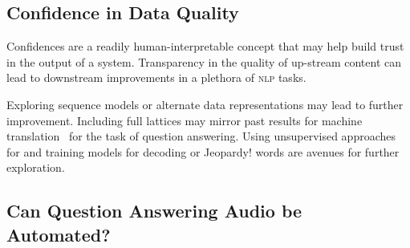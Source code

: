 \begin{comment}

By manually examining the predictions of the seq2seq model, we notice that the main source of errors is that the model tends to find a short path to completing the rewrites. That often results in \textit{under-specified questions} as in Example~1 in Table~\ref{tab:erranalysis}, \textit{question meaning change} as in Example~2 or \textit{meaningless questions} as in Example~3.

Another source of errors is having related entities mentioned in the context as 
Example~4 in Table~\ref{tab:erranalysis}, where the model confused ``Copa America''
with ``Argentina''. The model also struggles with listing multiple entities mentioned in different parts of the context. Example~5 in Table~\ref{tab:erranalysis}
show the output and the reference rewrites of the question \textit{``Did she have any more works than those 3?''}, where two of the three
	entities---``United States of Banana'', ``La Comedia'' and ``Asalto al tiempo''---are lost in the rewrite.  

\end{comment}


\subsection{Confidence in Data Quality}
\label{sec:discussion}


Confidences are a readily human-interpretable concept that may help build trust in the output of a system.
%
Transparency in the quality of up-stream content can lead to downstream improvements in a plethora of \textsc{nlp} tasks.

Exploring sequence models or alternate data representations may lead
to further improvement.  Including full lattices may mirror past results for machine
translation~\citep{sperber17emnlp} for the task of question answering.
Using unsupervised approaches for \asr{}
\citep{wessel2004unsupervised,lee2009unsupervised} and training \asr{}
models for decoding \qb{} or Jeopardy! words are avenues for further
exploration.

\subsection{Can Question Answering Audio be Automated? }
\label{sec:conclusion}

